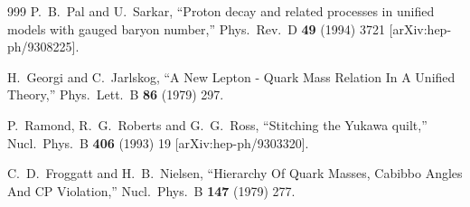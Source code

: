\begin{thebibliography}{999}
  P.~B.~Pal and U.~Sarkar,
  ``Proton decay and related processes in unified models with gauged baryon
  number,''
  Phys.\ Rev.\ D {\bf 49} (1994) 3721
  [arXiv:hep-ph/9308225].

  H.~Georgi and C.~Jarlskog,
  ``A New Lepton - Quark Mass Relation In A Unified Theory,''
  Phys.\ Lett.\ B {\bf 86} (1979) 297.

  P.~Ramond, R.~G.~Roberts and G.~G.~Ross,
  ``Stitching the Yukawa quilt,''
  Nucl.\ Phys.\ B {\bf 406} (1993) 19
  [arXiv:hep-ph/9303320].

  C.~D.~Froggatt and H.~B.~Nielsen,
  ``Hierarchy Of Quark Masses, Cabibbo Angles And CP Violation,''
  Nucl.\ Phys.\ B {\bf 147} (1979) 277.


\end{thebibliography}
